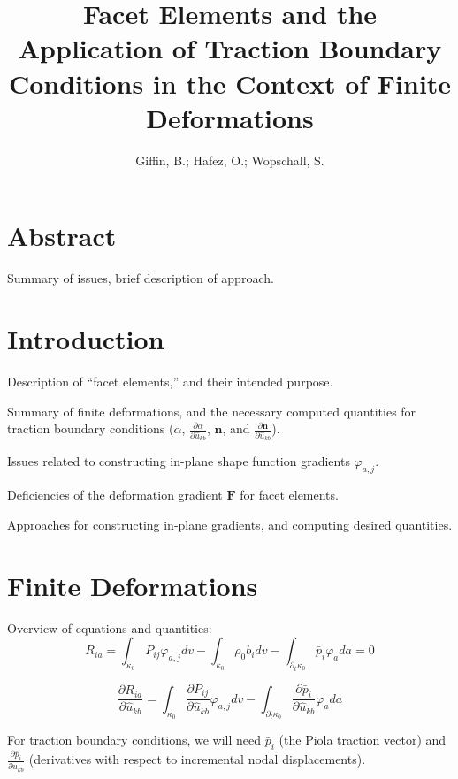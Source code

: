 \documentclass[11pt]{article} %
\title{\textbf{Facet Elements and the Application of Traction Boundary Conditions in the Context of Finite Deformations}}
\author{Giffin, B.; Hafez, O.; Wopschall, S.}
\date{}
\begin{document}
\maketitle

\section{Abstract}

Summary of issues, brief description of approach.

\section{Introduction}

Description of ``facet elements,'' and their intended purpose.

Summary of finite deformations, and the necessary computed quantities for traction boundary conditions ($\alpha$, $\frac{\partial \alpha}{\partial \hat{u}_{kb}}$, $\mathbf{n}$, and  $\frac{\partial \mathbf{n}}{\partial \hat{u}_{kb}}$).

Issues related to constructing in-plane shape function gradients $\varphi_{a,j}$.

Deficiencies of the deformation gradient $\mathbf{F}$ for facet elements.

Approaches for constructing in-plane gradients, and computing desired quantities.

\section{Finite Deformations}

Overview of equations and quantities:
\begin{equation}
	R_{ia} = \int_{\kappa_0} P_{ij} \varphi_{a,j} dv - \int_{\kappa_0} \rho_0 b_i dv - \int_{\partial_t \kappa_0} \bar{p}_i \varphi_a da = 0
\end{equation}

\begin{equation}
	\frac{\partial R_{ia}}{\partial \hat{u}_{kb}} = \int_{\kappa_0} \frac{\partial P_{ij}}{\partial \hat{u}_{kb}} \varphi_{a,j} dv - \int_{\partial_t \kappa_0} \frac{\partial \bar{p}_i}{\partial \hat{u}_{kb}} \varphi_{a} da
\end{equation}

For traction boundary conditions, we will need $\bar{p}_i$ (the Piola traction vector) and $\frac{\partial \bar{p}_i}{\partial \hat{u}_{kb}}$ (derivatives with respect to incremental nodal displacements).
\end{document}

